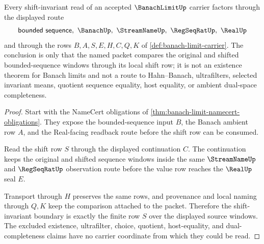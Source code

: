 \begin{theorem}
\label{thm:banach-limit-shift-invariant-boundary}
Every shift-invariant read of an accepted $\BanachLimitUp$ carrier factors through the displayed route
$$
\mathsf{bounded\ sequence},\ \BanachUp,\ \StreamNameUp,\ \RegSeqRatUp,\ \RealUp
$$
and through the rows $B,A,S,E,H,C,Q,K$ of \autoref{def:banach-limit-carrier}. The conclusion is only that the named packet compares the original and shifted bounded-sequence windows through its local shift row; it is not an existence theorem for Banach limits and not a route to Hahn--Banach, ultrafilters, selected invariant means, quotient sequence equality, host equality, or ambient dual-space completeness.
\end{theorem}
\begin{proof}
Start with the NameCert obligations of \autoref{thm:banach-limit-namecert-obligations}. They expose the bounded-sequence input $B$, the Banach ambient row $A$, and the Real-facing readback route before the shift row can be consumed.

Read the shift row $S$ through the displayed continuation $C$. The continuation keeps the original and shifted sequence windows inside the same $\StreamNameUp$ and $\RegSeqRatUp$ observation route before the value row reaches the $\RealUp$ seal $E$.

Transport through $H$ preserves the same rows, and provenance and local naming through $Q,K$ keep the comparison attached to the packet. Therefore the shift-invariant boundary is exactly the finite row $S$ over the displayed source windows. The excluded existence, ultrafilter, choice, quotient, host-equality, and dual-completeness claims have no carrier coordinate from which they could be read.
\end{proof}



